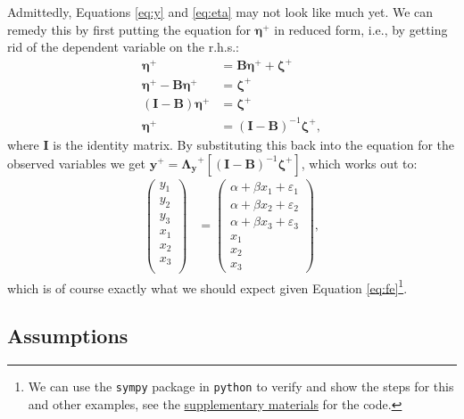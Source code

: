 \documentclass[]{interact}
\theoremstyle{plain}%
\theoremstyle{definition}
\theoremstyle{remark}
\begin{document}
Admittedly, Equations \eqref{eq:y} and \eqref{eq:eta} may not look like
much yet. We can remedy this by first putting the equation for
\(\bm{\eta}^{+}\) in reduced form, i.e., by getting rid of the dependent
variable on the r.h.s.: \begin{align}
\bm{\eta}^{+} & = \bm{B}\bm{\eta}^{+} + \bm{\zeta}^{+} \\
\bm{\eta}^{+} - \bm{B}\bm{\eta}^{+} & = \bm{\zeta}^{+} \\
(\bm{I} - \bm{B})\bm{\eta}^{+} & = \bm{\zeta}^{+} \\
\bm{\eta}^{+} & = (\bm{I} - \bm{B})^{-1}\bm{\zeta}^{+},
\end{align} where \(\bm{I}\) is the identity matrix. By substituting
this back into the equation for the observed variables we get
\(\bm{y}^{+} = \bm{\Lambda_{y}}^{+}[(\bm{I} - \bm{B})^{-1}\bm{\zeta}^{+}]\),
which works out to: \begin{align}
\begin{pmatrix} 
y_{1} \\
y_{2} \\
y_{3} \\
x_{1} \\
x_{2} \\
x_{3} \\
\end{pmatrix} & = 
\begin{pmatrix}
\alpha + \beta x_{1} + \varepsilon_{1} \\
\alpha + \beta x_{2} + \varepsilon_{2} \\
\alpha + \beta x_{3} + \varepsilon_{3} \\
x_{1} \\
x_{2} \\
x_{3}
\end{pmatrix},
\end{align} which is of course exactly what we should expect given
Equation \eqref{eq:fe}\footnote{We can use the \texttt{sympy} package in
  \texttt{python} to verify and show the steps for this and other
  examples, see the
  \href{https://github.com/henrik-andersen/FE-SEM/blob/master/sympy-doublecheck-matrixnotation.py}{supplementary
  materials} for the code.}.

\hypertarget{assumptions}{%
\subsection{Assumptions}\label{assumptions}}
\end{document}

